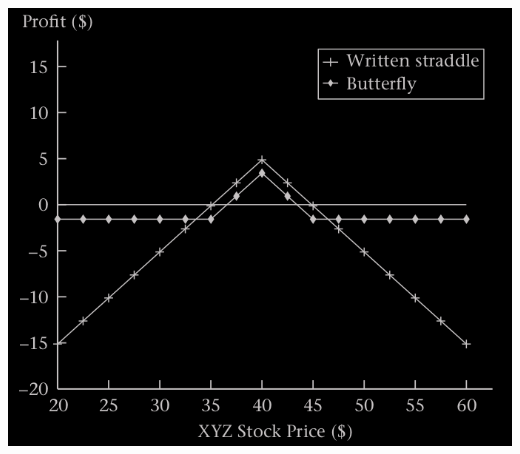 \begin{frame}[fragile,t]
	\begin{center}
			\includegraphics[scale=0.3]{figs/Figure-3-14.png}
	\end{center}
	\myEnd
\end{frame}
